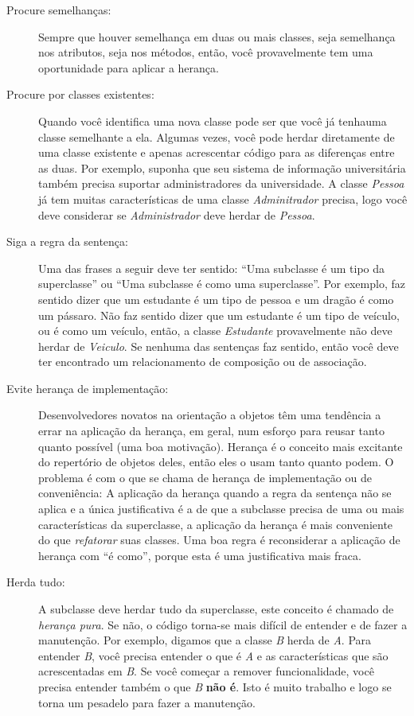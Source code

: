 \documentclass[
	article,			%
	12pt,				%
	openright,
	twoside,			%
	a4paper,			%
	english,			%
	french,
	brazil,				%
	sumario=tradicional
	]{abntex2}
\begin{document}
\begin{description}
\item[Procure semelhanças:] Sempre que houver semelhança em duas ou mais classes, seja semelhança nos atributos, seja nos métodos, então, você provavelmente tem uma oportunidade para aplicar a herança.

\item[Procure por classes existentes:] Quando você identifica uma nova classe pode ser que você já tenhauma classe semelhante a ela. Algumas vezes, você pode herdar diretamente de uma classe existente e apenas acrescentar código para as diferenças entre as duas. Por exemplo, suponha que seu sistema de informação universitária também precisa suportar administradores da universidade. A classe \emph{Pessoa} já tem muitas características de uma classe \emph{Adminitrador} precisa, logo você deve considerar se \emph{Administrador} deve herdar de \emph{Pessoa}.

\item[Siga a regra da sentença:] Uma das frases a seguir deve ter sentido: ``Uma subclasse é um tipo da superclasse'' ou ``Uma subclasse é como uma superclasse''. Por exemplo, faz sentido dizer que um estudante é um tipo de pessoa e um dragão é como um pássaro. Não faz sentido dizer que um estudante é um tipo de veículo, ou é como um veículo, então, a classe \emph{Estudante} provavelmente não deve herdar de \emph{Veiculo}. Se nenhuma das sentenças faz sentido, então você deve ter encontrado um relacionamento de composição ou de associação.

\item[Evite herança de implementação:] Desenvolvedores novatos na orientação a objetos têm uma tendência a errar na aplicação da herança, em geral, num esforço para reusar tanto quanto possível (uma boa motivação). Herança é o conceito mais excitante do repertório de objetos deles, então eles o usam tanto quanto podem. O problema é com o que se chama de herança de implementação ou de conveniência: A aplicação da herança quando a regra da sentença não se aplica e a única justificativa é a de que a subclasse precisa de uma ou mais características da superclasse, a aplicação da herança é mais conveniente do que \textit{refatorar} suas classes. Uma boa regra é reconsiderar a aplicação de herança com ``é como'', porque esta é uma justificativa mais fraca.

\item[Herda tudo:] A subclasse deve herdar tudo da superclasse, este conceito é chamado de \emph{herança pura}. Se não, o código torna-se mais difícil de entender e de fazer a manutenção. Por exemplo, digamos que a classe \emph{B} herda de \emph{A}. Para entender \emph{B}, você precisa entender o que é \emph{A} e as características que são acrescentadas em \emph{B}. Se você começar a remover funcionalidade, você precisa entender também o que \emph{B} \textbf{não é}. Isto é muito trabalho e logo se torna um pesadelo para fazer a manutenção.

\end{description}
\end{document}
